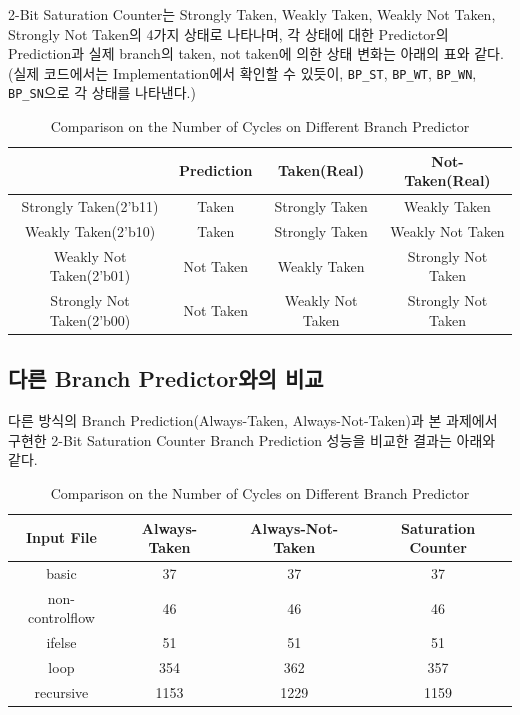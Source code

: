 \documentclass[openright, a4paper]{article}
\newcommand{\code}[1]{\texttt{#1}}
\begin{document}
2-Bit Saturation Counter는 Strongly Taken, Weakly Taken, Weakly Not Taken, Strongly Not Taken의 4가지 상태로 나타나며, 각 상태에 대한 Predictor의 Prediction과 실제 branch의 taken, not taken에 의한 상태 변화는 아래의 표와 같다.
(실제 코드에서는 Implementation에서 확인할 수 있듯이, \code{BP_ST}, \code{BP_WT}, \code{BP_WN}, \code{BP_SN}으로 각 상태를 나타낸다.)

\begin{table}[!h]
  \centering
  \begin{tabular}{@{}cccc@{}}
    \hline
     & Prediction & Taken(Real) & Not-Taken(Real) \\
    \hline
    Strongly Taken(2'b11) & Taken & Strongly Taken & Weakly Taken \\
    Weakly Taken(2'b10) & Taken & Strongly Taken & Weakly Not Taken \\
    Weakly Not Taken(2'b01) & Not Taken & Weakly Taken & Strongly Not Taken \\
    Strongly Not Taken(2'b00) & Not Taken & Weakly Not Taken & Strongly Not Taken \\
    \hline
  \end{tabular}
  \caption{Comparison on the Number of Cycles on Different Branch Predictor}
  \label{tab:comparison}
\end{table}

\subsection{다른 Branch Predictor와의 비교}

다른 방식의 Branch Prediction(Always-Taken, Always-Not-Taken)과 본 과제에서 구현한 2-Bit Saturation Counter Branch Prediction 성능을 비교한 결과는 아래와 같다.

\begin{table}[!h]
  \centering
  \begin{tabular}{@{}cccc@{}}
    \hline
    Input File & Always-Taken & Always-Not-Taken & Saturation Counter \\
    \hline
    basic & 37 & 37 & 37 \\
    non-controlflow & 46 & 46 & 46 \\
    ifelse & 51 & 51 & 51 \\
    loop & 354 & 362 & 357 \\
    recursive & 1153 & 1229 & 1159 \\
    \hline
  \end{tabular}
  \caption{Comparison on the Number of Cycles on Different Branch Predictor}
  \label{tab:comparison}
\end{table}
\end{document}
